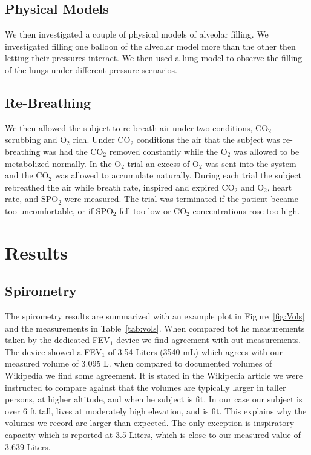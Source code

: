 \documentclass[12pt]{article}
\newcommand{\coo}{CO$_2$}
\newcommand{\oo}{O$_2$}
\begin{document}
\subsection{Physical Models}
We then investigated a couple of physical models of alveolar filling. We investigated filling one balloon of the alveolar model more than the other then letting their pressures interact. We then used a lung model to observe the filling of the lungs under different pressure scenarios.

\subsection{Re-Breathing}
We then allowed the subject to re-breath air under two conditions, CO$_2$ scrubbing and O$_2$ rich. Under \coo{} conditions the air  that the subject was re-breathing was had the \coo{} removed constantly while the \oo{} was allowed to be metabolized normally. In the \oo{} trial an excess of \oo{} was sent into the system and the \coo{} was allowed to accumulate naturally. During each trial the subject rebreathed the air while breath rate, inspired and expired \coo{} and \oo{}, heart rate, and SPO$_2$ were measured. The trial was terminated if the patient became too uncomfortable, or if SPO$_2$ fell too low or \coo{} concentrations rose too high.

\section{Results}
\subsection{Spirometry}
 The spirometry results are summarized with an example plot in Figure~\ref{fig:Vols} and the measurements in Table~\ref{tab:vols}. When compared tot he measurements taken by the dedicated FEV$_1$ device we find agreement with out measurements. The device showed a FEV$_1$ of 3.54 Liters (3540 mL) which agrees with our measured volume of 3.095 L. when compared to documented volumes of Wikipedia we find some agreement. It is stated in the Wikipedia article we were instructed to compare against that the volumes are typically larger in taller persons, at higher altitude, and when he subject is fit. In our case our subject is over 6 ft tall, lives at moderately high elevation, and is fit. This explains why the volumes we record are larger than expected. The only exception is inspiratory capacity which is reported at 3.5 Liters, which is close to our measured value of 3.639 Liters.
\end{document}
